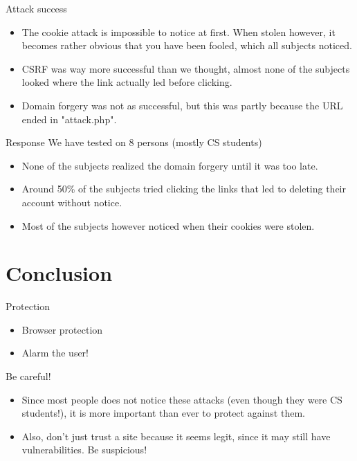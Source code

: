 \documentclass{beamer}
\begin{document}
\begin{frame}{Attack success}
    \begin{itemize}
        \item
            The cookie attack is impossible to notice at first. When stolen
            however, it becomes rather obvious that you have been fooled, which
            all subjects noticed.
        \item
            CSRF was way more successful than we thought, almost none of the
            subjects looked where the link actually led before clicking.
        \item
            Domain forgery was not as successful, but this was partly because
            the URL ended in "attack.php".
    \end{itemize}
\end{frame}

\begin{frame}{Response}
    We have tested on 8 persons (mostly CS students)
    \begin{itemize}
        \item None of the subjects realized the domain forgery until it was too
              late.
        \item Around 50\% of the subjects tried clicking the links that led to
              deleting their account without notice.
        \item Most of the subjects however noticed when their cookies were
              stolen.
    \end{itemize}
\end{frame}

\section{Conclusion}

\begin{frame}{Protection}
    \begin{itemize}
        \item Browser protection
        \item Alarm the user!
    \end{itemize}
\end{frame}

\begin{frame}{Be careful!}
    \begin{itemize}
        \item Since most people does not notice these attacks (even though they
              were CS students!), it is more important than ever to protect
              against them.
        \item Also, don't just trust a site because it seems legit, since it may
              still have vulnerabilities. Be suspicious!
    \end{itemize}
\end{frame}
\end{document}
